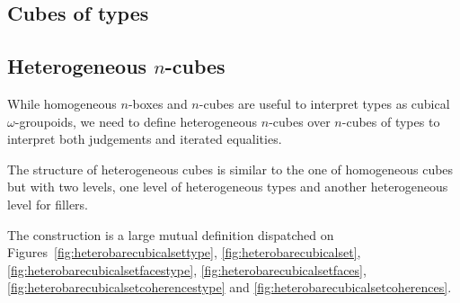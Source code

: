 \documentclass{article}
\newcommand{\sort}[1]{\mathsf{U}_{#1}}
\newcommand{\defeq}{\triangleq}
\begin{document}
\subsection{Cubes of types}

\subsection{Heterogeneous $n$-cubes}

While homogeneous $n$-boxes and $n$-cubes are useful to interpret
types as cubical $\omega$-groupoids, we need to define heterogeneous
$n$-cubes over $n$-cubes of types to interpret both judgements and
iterated equalities.

The structure of heterogeneous cubes is similar to the one of
homogeneous cubes but with two levels, one level of heterogeneous
types and another heterogeneous level for fillers.

The construction is a large mutual definition dispatched on
Figures~\ref{fig:heterobarecubicalsettype},
\ref{fig:heterobarecubicalset},
\ref{fig:heterobarecubicalsetfacestype},
\ref{fig:heterobarecubicalsetfaces},
\ref{fig:heterobarecubicalsetcoherencestype} and
\ref{fig:heterobarecubicalsetcoherences}.
\end{document}
